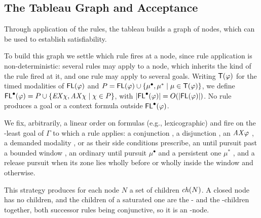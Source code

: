 
\subsection{The Tableau Graph and Acceptance}\label{ss:loop}

Through application of the rules, the tableau builds a graph of nodes, which can be used to establish satisfiability. 




To build this graph we settle which rule fires at a node, since rule application is
non-deterministic: several rules may apply to a node, which inherits the kind of the rule fired at it, and
one rule may apply to several goals.
Writing $\mathsf{T}(\varphi)$ for the timed modalities of $\mathsf{FL}(\varphi)$ and
$P=\mathsf{FL}(\varphi)\cup\{\mu^\bullet,\mu^{\ast}\mid\mu\in\mathsf{T}(\varphi)\}$, we define
$\mathsf{FL}^{\bullet}(\varphi)=P\cup\{\mathit{EX}\chi,\mathit{AX}\chi\mid\chi\in P\}$, with $|\mathsf{FL}^{\bullet}(\varphi)|=O(|\mathsf{FL}(\varphi)|)$. No rule produces a goal or a
context formula outside $\mathsf{FL}^{\bullet}(\varphi)$.



We fix, arbitrarily, a linear order \FormalSmaller{} on formulas (e.g., lexicographic)
and fire on the \FormalSmaller-least goal of $\Gamma$ to which a rule applies: a conjunction , a disjunction , an
$\mathit{AX}\varphi$ , a demanded modality ,  or 
as their side conditions prescribe, an until pursuit past a bounded window , an
ordinary until pursuit $\mu^\bullet$ 
and a persistent one $\mu^{\ast}$ , and a release pursuit
 when its zone lies wholly before or wholly inside
the window and  otherwise.

This strategy produces for each node $N$ a set of children $\mathit{ch}(N)$. A closed node has no children,
and the children of a saturated one are the - and the
-children together, both successor rules being conjunctive, so it is an \ANDn-node.





